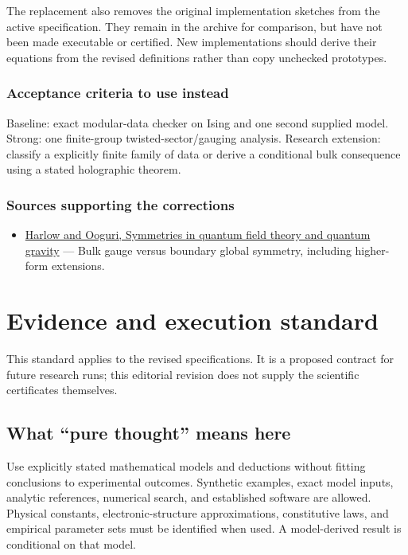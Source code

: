 \documentclass[
  11pt,
]{article}
\providecommand{\tightlist}{%
  \setlength{\itemsep}{0pt}\setlength{\parskip}{0pt}}
\begin{document}
The replacement also removes the original implementation sketches from
the active specification. They remain in the archive for comparison, but
have not been made executable or certified. New implementations should
derive their equations from the revised definitions rather than copy
unchecked prototypes.

\subsubsection{Acceptance criteria to use instead}

Baseline: exact modular-data checker on Ising and one second supplied
model. Strong: one finite-group twisted-sector/gauging analysis.
Research extension: classify a explicitly finite family of data or
derive a conditional bulk consequence using a stated holographic
theorem.

\subsubsection{Sources supporting the corrections}

\begin{itemize}
\tightlist
\item
  \href{https://arxiv.org/abs/1810.05338}{Harlow and Ooguri, Symmetries
  in quantum field theory and quantum gravity} --- Bulk gauge versus
  boundary global symmetry, including higher-form extensions.
\end{itemize}

\section{Evidence and execution standard}

This standard applies to the revised specifications. It is a proposed
contract for future research runs; this editorial revision does not
supply the scientific certificates themselves.

\subsection{What ``pure thought'' means here}

Use explicitly stated mathematical models and deductions without fitting
conclusions to experimental outcomes. Synthetic examples, exact model
inputs, analytic references, numerical search, and established software
are allowed. Physical constants, electronic-structure approximations,
constitutive laws, and empirical parameter sets must be identified when
used. A model-derived result is conditional on that model.
\end{document}
